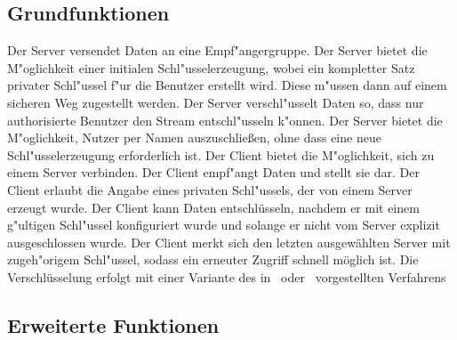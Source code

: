 \documentclass[a4paper,10pt]{scrartcl}
\begin{document}
\subsection{Grundfunktionen}

\begin{usecase}
 {Der Server versendet Daten an eine Empf"angergruppe.}
 {Der Server bietet die M"oglichkeit einer initialen Schl"usselerzeugung, wobei
                 ein kompletter Satz privater Schl"ussel f"ur die Benutzer erstellt wird.
                 Diese m"ussen dann auf einem sicheren Weg zugestellt werden.}
 {Der Server verschl"usselt Daten so, dass nur authorisierte
                 Benutzer den Stream entschl"usseln k"onnen.}
 {Der Server bietet die M"oglichkeit, Nutzer per Namen auszuschließen,
                 ohne dass eine neue Schl"usselerzeugung erforderlich ist.}
 {Der Client bietet die M"oglichkeit, sich zu einem Server verbinden.}
 {Der Client empf"angt Daten und stellt sie dar.}
 {Der Client erlaubt die Angabe eines privaten Schl"ussels, der von
                 einem Server erzeugt wurde.}
 {Der Client kann Daten entschlüsseln, nachdem er mit einem
                 g"ultigen Schl"ussel konfiguriert wurde und solange er nicht
                 vom Server explizit ausgeschlossen wurde.}
 {Der Client merkt sich den letzten ausgewählten Server mit
                 zugeh"origem Schl"ussel, sodass ein erneuter Zugriff schnell möglich
                 ist.}
 {Die Verschlüsselung erfolgt mit einer Variante des in~\cite[Section 2.2]{Naor00}
                  oder~\cite{Garg10} vorgestellten Verfahrens}
\end{usecase}

\subsection{Erweiterte Funktionen}
\end{document}
